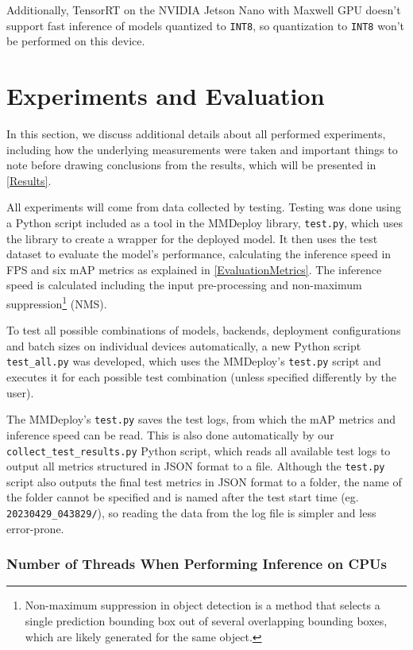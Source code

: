 Additionally, TensorRT on the NVIDIA Jetson Nano with Maxwell GPU doesn't
support fast inference of models quantized to \texttt{INT8}, so quantization to
\texttt{INT8} won't be performed on this device.



\section{Experiments and Evaluation}

In this section, we discuss additional details about all performed experiments,
including how the underlying measurements were taken and important things to
note before drawing conclusions from the results, which will be presented in
\autoref{Results}.

All experiments will come from data collected by testing. Testing was done using
a Python script included as a tool in the MMDeploy library, \texttt{test.py},
which uses the library to create a wrapper for the deployed model. It then uses
the test dataset to evaluate the model's performance, calculating the
inference speed in FPS and six mAP metrics as explained in
\autoref{EvaluationMetrics}. The inference speed is calculated including the
input pre-processing and non-maximum suppression\footnote{Non-maximum
suppression in object detection is a method that selects a single prediction
bounding box out of several overlapping bounding boxes, which are likely
generated for the same object.} (NMS).

To test all possible combinations of models, backends, deployment configurations
and batch sizes on individual devices automatically, a new Python script
\texttt{test\_all.py} was developed, which uses the MMDeploy's \texttt{test.py}
script and executes it for each possible test combination (unless specified
differently by the user).

The MMDeploy's \texttt{test.py} saves the test logs, from which the mAP metrics
and inference speed can be read. This is also done automatically by our
\texttt{collect\_test\_results.py} Python script, which reads all available test
logs to output all metrics structured in JSON format to a file. Although the
\texttt{test.py} script also outputs the final test metrics in JSON format to a
folder, the name of the folder cannot be specified and is named after the test
start time (eg. \texttt{20230429\_043829/}), so reading the data from the log
file is simpler and less error-prone.


\subsubsection*{Number of Threads When Performing Inference on CPUs}

